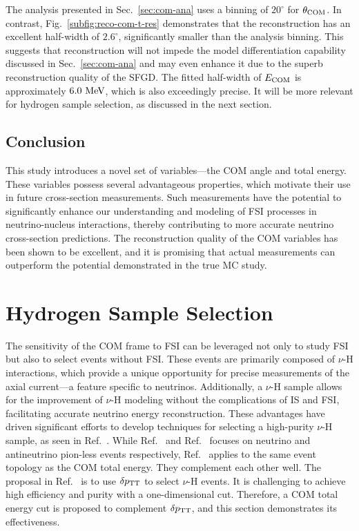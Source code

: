      The analysis presented in Sec.~\ref{sec:com-ana} uses a binning of $20^\circ$ for $\theta_{\textrm{COM}}$. In contrast, Fig.~\ref{subfig:reco-com-t-res} demonstrates that the reconstruction has an excellent half-width of $2.6^\circ$, significantly smaller than the analysis binning. This suggests that reconstruction will not impede the model differentiation capability discussed in Sec.~\ref{sec:com-ana} and may even enhance it due to the superb reconstruction quality of the SFGD. The fitted half-width of $E_{\textrm{COM}}$ is approximately $6.0~\textrm{MeV}$, which is also exceedingly precise. It will be more relevant for hydrogen sample selection, as discussed in the next section. 

     \subsection{Conclusion}
     This study introduces a novel set of variables—the COM angle and total energy. These variables possess several advantageous properties, which motivate their use in future cross-section measurements. Such measurements have the potential to significantly enhance our understanding and modeling of FSI processes in neutrino-nucleus interactions, thereby contributing to more accurate neutrino cross-section predictions. The reconstruction quality of the COM variables has been shown to be excellent, and it is promising that actual measurements can outperform the potential demonstrated in the true MC study.

\section{Hydrogen Sample Selection}
\label{sec:mc-hydrogen}
The sensitivity of the COM frame to FSI can be leveraged not only to study FSI but also to select events without FSI. 
These events are primarily composed of $\nu$-H interactions, which provide a unique opportunity for precise measurements of the axial current—a feature specific to neutrinos. 
Additionally, a $\nu$-H sample allows for the improvement of $\nu$-H modeling without the complications of IS and FSI, facilitating accurate neutrino energy reconstruction. 
These advantages have driven significant efforts to develop techniques for selecting a high-purity $\nu$-H sample, as seen in Ref.~\cite{Lu:2015hea,MINERvA:2023avz,Baudis:2023tma}.
While Ref.~\cite{Baudis:2023tma} and Ref.~\cite{MINERvA:2023avz} focuses on neutrino and antineutrino pion-less events respectively, Ref.~\cite{Lu:2015hea} applies to the same event topology as the COM total energy. 
They complement each other well.
The proposal in Ref.~\cite{Lu:2015hea} is to use $\delta p_\textrm{TT}$ to select $\nu$-H events.
It is challenging to achieve high efficiency and purity with a one-dimensional cut. 
Therefore, a COM total energy cut is proposed to complement $\delta p_\textrm{TT}$, and this section demonstrates its effectiveness.

